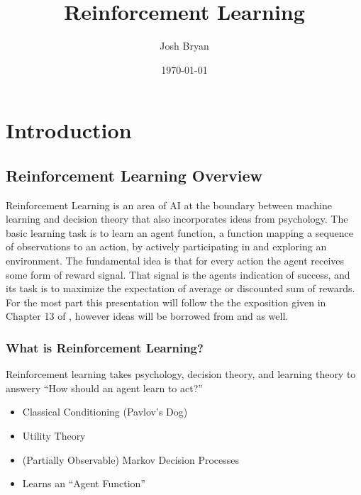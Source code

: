 \documentclass[ignorenonframetext]{beamer}
\title{Reinforcement Learning}
\author{Josh Bryan}
\institute{University of Illinois at Chicago, MCS 548}
\date{\today}
\begin{document}
\maketitle

\section{Introduction}


\subsection{Reinforcement Learning Overview}

	Reinforcement Learning is an area of AI at the boundary between machine
	learning and decision theory that also incorporates ideas from
	psychology.  The basic learning task is to learn an agent function,
	a function mapping a sequence of observations to an action, by
	actively participating in and exploring an environment.  The
	fundamental idea is that for every action the agent receives some form of
	reward signal.  That signal is the agents indication of success, and
	its task is to maximize the expectation of average or discounted sum
	of rewards.  For the most part this presentation will follow the
	the exposition given in Chapter 13 of \cite{mitchell_machine_1997},
	however ideas will be borrowed from
	\cite{kaelbling_reinforcement_1996} and
	\cite{russell_artificial_2010} as well.  

\begin{frame}
	\frametitle{What is Reinforcement Learning?}
	\begin{block}{}
		Reinforcement learning takes psychology, decision theory, and
		learning theory to answery ``How should an agent learn to act?''
	\end{block}
	\begin{itemize}
		\item Classical Conditioning (Pavlov's Dog)
		\item Utility Theory
		\item (Partially Observable) Markov Decision Processes
		\item Learns an ``Agent Function''
	\end{itemize}
\end{frame}
\end{document}
